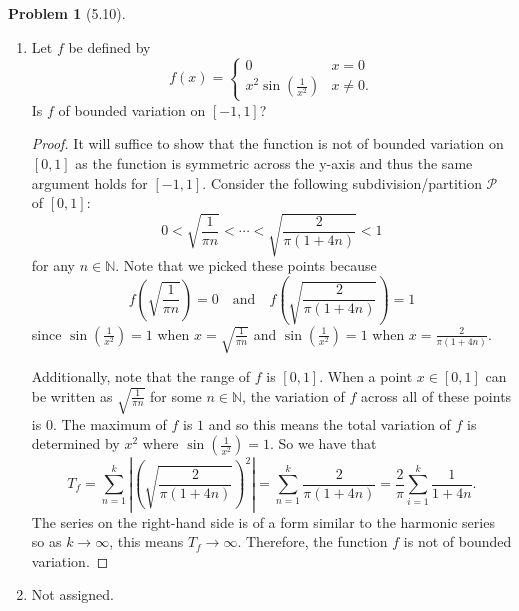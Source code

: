 \documentclass[12pt]{article}
\newcommand{\N}{\mathbb{N}}
\newcommand{\abs}[1]{\left\lvert #1 \right\rvert}
\theoremstyle{definition}
\newtheorem{problem}{Problem}
\begin{document}
\begin{problem}[5.10]

  \begin{enumerate}[label = (\alph{*})]
    \item  Let \( f \) be defined  by
      \[
          f(x) = \begin{cases}
            0 & x = 0 \\
            x^2 \sin \left( \frac{1}{x^2} \right) & x \neq 0.
          \end{cases}
      \]
      Is \( f \) of bounded variation on \( [-1,1] \)?

          \begin{proof}
            It will suffice to show that the function is not of bounded variation on \( [0,1] \) as the function is symmetric across the y-axis and thus the same argument holds for \( [-1, 1] \).
            Consider the following subdivision/partition \( \mathcal{P} \) of \( [0, 1] \):
              \[
                   0 < \sqrt{\frac{1}{\pi n}} < \cdots < \sqrt{\frac{2}{\pi(1 + 4n)}} < 1
              \]
            for any \( n \in \N \). Note that we picked these points because \(\)
              \[
                  f\left( \sqrt{\frac{1}{\pi n}}  \right) = 0 \quad \text{and} \quad f \left(  \sqrt{\frac{2}{\pi(1 + 4n)}}\right) = 1
              \]
            since \( \displaystyle \sin \left( \frac{1}{x^2}\right) = 1\) when \( \displaystyle x = \sqrt{\frac{1}{\pi n}} \) and \( \displaystyle \sin \left( \frac{1}{x^2}\right) = 1 \) when \( \displaystyle x = \frac{2}{\pi(1 + 4n)} \).

             Additionally, note that the range of \(f\) is \( [0,1] \).
             When a point \( x \in [0, 1] \) can be written as \( \displaystyle \sqrt{\frac{1}{\pi n}}\) for some \( n \in \N \), the variation of \( f \) across all of these points is \( 0 \). The maximum of \( f \) is \( 1 \) and so this means the total variation of \( f \) is determined by \( x^2 \) where \( \displaystyle \sin \left( \frac{1}{x^2}  \right) = 1 \). So we have that 
              \[
                  T_f = \sum_{n=1}^{k} \abs{\left(\sqrt{\frac{2}{\pi(1 + 4n)}}\right)^{2}} = \sum_{n=1}^{k} \frac{2}{\pi(1 + 4n)} = \frac{2}{\pi} \sum_{i=1}^{k} \frac{1}{1 + 4n}
.              \]
            The series on the right-hand side is of a form similar to the harmonic series so as \( k \to \infty \), this means \( T_f \to \infty \). Therefore, the function \( f \) is not of bounded variation. 
          \end{proof}
    \item  Not assigned. 
  \end{enumerate}

    
\end{problem}
\end{document}
